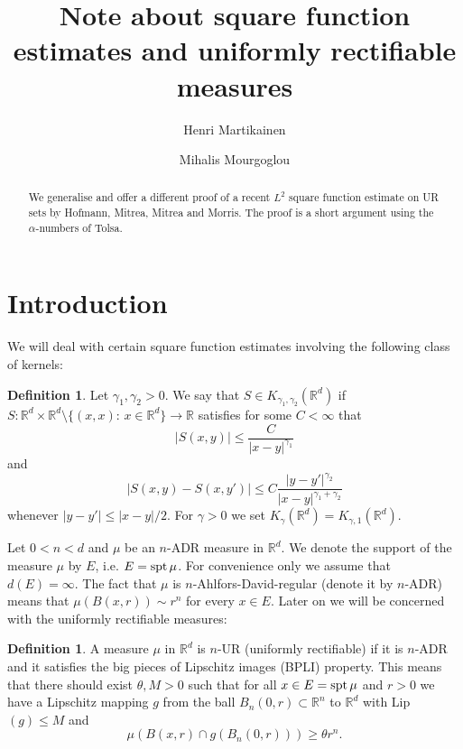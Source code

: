 \documentclass[11pt,a4paper,leqno]{amsart}
\author{Henri Martikainen}
\author{Mihalis Mourgoglou}
\title{Note about square function estimates and uniformly rectifiable measures}
\newcommand{\R}{\mathbb{R}}
\numberwithin{equation}{section}
\theoremstyle{plain}
\theoremstyle{definition}
\newtheorem{defn}[equation]{Definition}
\theoremstyle{remark}
\begin{document}
\begin{abstract}
We generalise and offer a different proof of a recent $L^2$ square function estimate on UR sets by
Hofmann, Mitrea, Mitrea and Morris. The proof is a short argument using the $\alpha$-numbers of Tolsa.
\end{abstract}

\maketitle

\section{Introduction}

We will deal with certain square function estimates involving the following class of kernels:
\begin{defn}
Let $\gamma_1, \gamma_2 > 0$.
We say that $S \in K_{\gamma_1, \gamma_2}(\R^d)$ if $S\colon \R^{d} \times \R^{d} \setminus \{(x,x)\colon\, x \in \R^{d}\} \to \R$ satisfies
for some $C < \infty$ that
\begin{displaymath}
|S(x,y)| \le \frac{C}{|x-y|^{\gamma_1}}
\end{displaymath}
and
\begin{displaymath}
|S(x,y) - S(x,y')| \le C\frac{|y-y'|^{\gamma_2}}{|x-y|^{\gamma_1+\gamma_2}}
\end{displaymath}
whenever $|y-y'| \le |x-y|/2$. For $\gamma > 0$ we set $K_{\gamma}(\R^d) = K_{\gamma, 1}(\R^d)$.
\end{defn}
Let $0 < n < d$ and $\mu$ be an $n$-ADR measure in $\R^d$.
We denote the support of the measure $\mu$ by $E$, i.e. $E = \textup{spt}\,\mu$. For convenience only we assume that
$d(E) = \infty$. The fact that $\mu$ is $n$-Ahlfors-David-regular (denote it by $n$-ADR) means that $\mu(B(x,r)) \sim r^n$ for every $x \in E$. Later on we will be concerned with the uniformly rectifiable measures:
\begin{defn}\label{defn:UR}
A measure $\mu$ in $\R^d$ is $n$-UR (uniformly rectifiable) if it is $n$-ADR and it satisfies the big pieces of Lipschitz images (BPLI) property.
This means that there should exist $\theta, M > 0$ such that for all $x \in E = \textup{spt}\,\mu$ and $r > 0$
we have a Lipschitz mapping $g$ from the ball $B_n(0,r) \subset \R^n$ to $\R^d$ with Lip$(g) \le M$ and
\begin{displaymath}
\mu(B(x,r) \cap g(B_n(0,r))) \ge \theta r^n.
\end{displaymath}
\end{defn}
\end{document}

